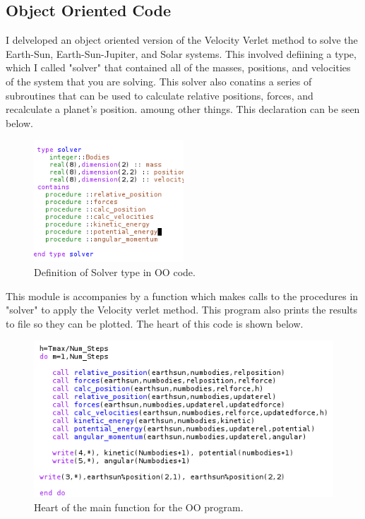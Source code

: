 \documentclass[%
oneside,                 %
final,                   %
10pt]{article}
\begin{document}
\subsection{Object Oriented Code}

I delveloped an object oriented version of the Velocity Verlet method to solve the Earth-Sun, Earth-Sun-Jupiter, and Solar systems.  This involved defiining a type, which I called "solver" that contained all of the masses, positions, and velocities of the system that you are solving.  This solver also conatins a series of subroutines that can be used to calculate relative positions, forces, and recalculate a planet's position. amoung other things.  This declaration can be seen below.

\begin{figure}[H]\label{fig:velrplot}
  \centering
    \includegraphics[width=0.5\textwidth]{solver.PNG}
    \caption{Definition of Solver type in OO code.}
\end{figure}

This module is accompanies by a function which makes calls to the procedures in "solver" to apply the Velocity verlet method.  This program also prints the results to file so they can be plotted.  The heart of this code is shown below.

\begin{figure}[H]\label{fig:velrplot}
  \centering
    \includegraphics[width=1.0\textwidth]{twobody.PNG}
    \caption{Heart of the main function for the OO program.}
\end{figure}
\end{document}
